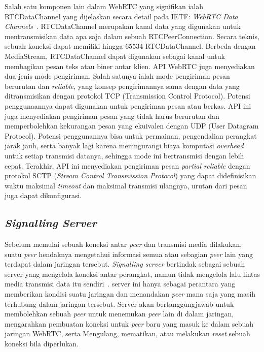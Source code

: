 Salah satu komponen lain dalam WebRTC yang signifikan ialah RTCDataChannel yang dijelaskan secara detail pada IETF: \textit{WebRTC Data Channels}~\citep{rfc8831}. RTCDataChannel merupakan kanal data yang digunakan untuk mentransmisikan data apa saja dalam sebuah RTCPeerConnection. Secara teknis, sebuah koneksi dapat memiliki hingga $65534$ RTCDataChannel. Berbeda dengan MediaStream, RTCDataChannel dapat digunakan sebagai kanal untuk membagikan pesan teks atau biner antar klien. API WebRTC juga menyediakan dua jenis mode pengiriman. Salah satunya ialah mode pengiriman pesan berurutan dan \textit{reliable}, yang konsep pengirimannya sama dengan data yang ditransmisikan dengan protokol TCP (Transmission Control Protocol). Potensi penggunaannya dapat digunakan untuk pengiriman pesan atau berkas. API ini juga menyediakan pengiriman pesan yang tidak harus berurutan dan memperbolehkan kekurangan pesan yang ekuivalen dengan UDP (User Datagram Protocol). Potensi penggunannya bisa untuk permainan, pengendalian perangkat jarak jauh, serta banyak lagi karena memngurangi biaya komputasi \textit{overhead} untuk setiap transmisi datanya, sehingga mode ini bertransmisi dengan lebih cepat. Terakhir, API ini menyediakan pengiriman pesan \textit{partial reliable} dengan protokol SCTP (\textit{Stream Control Transmission Protocol}) yang dapat didefinisikan waktu maksimal \textit{timeout} dan maksimal transmisi ulangnya, urutan dari pesan juga dapat dikonfigurasi.

\subsection{\textit{Signalling Server}}

Sebelum memulai sebuah koneksi antar \textit{peer} dan transmisi media dilakukan, suatu \textit{peer} hendaknya mengetahui informasi semua atau sebagian \textit{peer} lain yang terdapat dalam jaringan tersebut. \textit{Signalling server} bertindak sebagai sebuah server yang mengelola koneksi antar perangkat, namun tidak mengelola lalu lintas media transmisi data itu sendiri~\citep{rfc8839}. server ini hanya sebagai perantara yang memberikan kondisi suatu jaringan dan menandakan \textit{peer} mana saja yang masih terhubung dalam jaringan tersebut. Server akan bertanggungjawab untuk membolehkan sebuah \textit{peer} untuk menemukan \textit{peer} lain di dalam jaringan, mengarahkan pembuatan koneksi untuk \textit{peer} baru yang masuk ke dalam sebuah jaringan WebRTC, serta Mengulang, mematikan, atau melakukan \textit{reset} sebuah koneksi bila diperlukan.

